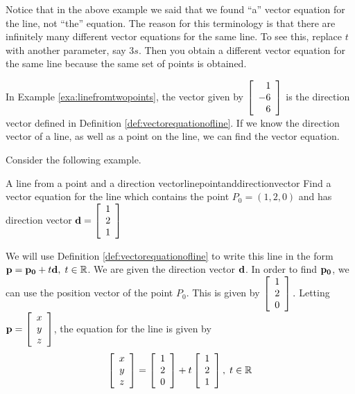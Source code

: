 Notice that in the above example we said that we found ``a'' vector
equation for the line, not ``the'' equation.  The reason for this
terminology is that there are infinitely many different vector 
equations for the same line. To see this, replace $t$ with another
parameter, say $3s.$ Then you obtain a different vector equation for the same
line because the same set of points is obtained.

In Example \ref{exa:linefromtwopoints}, the vector given by 
$\left[
\begin{array}{r}
 1 \\
-6 \\
6 
\end{array}
\right]$
is the direction vector defined in Definition \ref{def:vectorequationofline}.
If we know the direction vector of a line, as well as a point on the line,
we can find the vector equation. 

Consider the following example. 

\begin{example}{A line from a point and a direction vector}{linepointanddirectionvector}
Find a vector equation for the line which contains the point $P_0 = \left(
1,2,0\right) $ and has direction vector ${\bf d} = 
\left[
\begin{array}{c}
1 \\
2 \\
1
\end{array}
\right]
$
\end{example}

\begin{solution}
We will use Definition \ref{def:vectorequationofline} to write this line in the form 
${\bf p}={\bf p_0}+t{\bf d},\; t\in \mathbb{R}$. We are given the direction vector ${\bf d}$. 
In order to find ${\bf p_0}$, we can use the position vector of the point $P_0$. 
This is given by 
$\left[
\begin{array}{c}
1 \\
2 \\
0
\end{array}
\right].
$
Letting ${\bf p}
=
\left[
\begin{array}{c}
 x \\
y \\
z
\end{array}
\right]
$,
the equation for the line is given by 
\begin{equation}
\left[
\begin{array}{c}
x \\
y \\
z
\end{array}
\right]
=
\left[
\begin{array}{c}
1 \\
2 \\
0
\end{array}
\right]
+ 
t
\left[
\begin{array}{c}
1 \\
2 \\
1
\end{array}
\right],
\;t\in
\mathbb{R} \label{vectoreqn}
\end{equation}
\end{solution}

